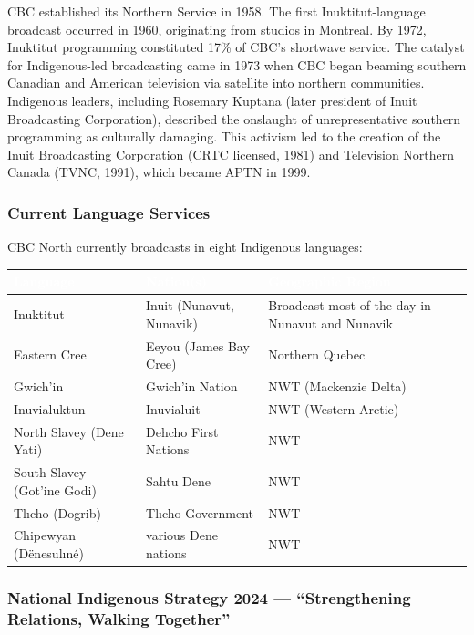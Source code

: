 \documentclass[11pt,letterpaper]{article}
\newcommand{\tableheader}[1]{\textbf{\sffamily\textcolor{white}{#1}}}
\begin{document}
CBC established its Northern Service in 1958. The first Inuktitut-language broadcast occurred in 1960, originating from studios in Montreal. By 1972, Inuktitut programming constituted 17\% of CBC's shortwave service. The catalyst for Indigenous-led broadcasting came in 1973 when CBC began beaming southern Canadian and American television via satellite into northern communities. Indigenous leaders, including Rosemary Kuptana (later president of Inuit Broadcasting Corporation), described the onslaught of unrepresentative southern programming as culturally damaging. This activism led to the creation of the Inuit Broadcasting Corporation (CRTC licensed, 1981) and Television Northern Canada (TVNC, 1991), which became APTN in 1999.

\subsubsection{Current Language Services}

CBC North currently broadcasts in eight Indigenous languages:

\begin{center}
\begin{tabularx}{\textwidth}{L{3.5cm}L{4cm}X}
\toprule
{}
\tableheader{Language} & \tableheader{Nation(s)} & \tableheader{Geographic Region} \\
\midrule
Inuktitut & Inuit (Nunavut, Nunavik) & Broadcast most of the day in Nunavut and Nunavik \\
Eastern Cree & Eeyou (James Bay Cree) & Northern Quebec \\
Gwich'in & Gwich'in Nation & NWT (Mackenzie Delta) \\
Inuvialuktun & Inuvialuit & NWT (Western Arctic) \\
North Slavey (Dene Yati) & Dehcho First Nations & NWT \\
South Slavey (Got'ine Godi) & Sahtu Dene & NWT \\
Tl\i{}cho (Dogrib) & Tl\i{}cho Government & NWT \\
Chipewyan (Dënesulıné) & various Dene nations & NWT \\
\bottomrule
\end{tabularx}
\end{center}

\subsubsection{National Indigenous Strategy 2024 --- ``Strengthening Relations, Walking Together''}
\end{document}

